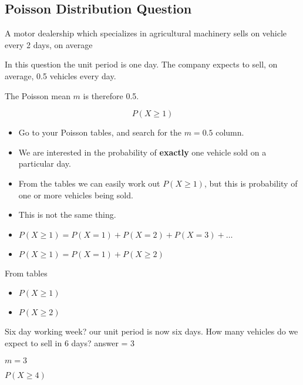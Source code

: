 \documentclass[]{report}
\begin{document}
\subsection{Poisson Distribution Question}

A motor dealership which specializes in agricultural machinery sells on vehicle every 2 days, on average


In this question the unit period is one day. The company expects to sell, on average, 0.5 vehicles every day.

The Poisson mean $m$ is therefore 0.5.


\[P(X \geq 1)\]


\begin{itemize}
\item Go to your Poisson tables, and search for the $m=0.5$ column.

\item We are interested in the probability of \textbf{exactly} one vehicle sold on a particular day.

\item From the tables we can easily work out $P(X \geq 1)$, but this is probability of one or more vehicles being sold.

\item This is not the same thing.
\end{itemize}


\begin{itemize}
\item
$P(X \geq 1) = P(X =1) + P( X=2) + P(X=3) + \ldots$
\item 
$P(X \geq 1) = P(X=1) + P(X \geq 2)$
\end{itemize}
From tables
\begin{itemize}
\item$P(X \geq 1)$
\item$P(X \geq 2)$
\end{itemize}

Six day working week?
our unit period is now six days.
How many vehicles do we expect to sell in 6 days?
answer = 3

$m=3$


$P(X\geq 4)$
\end{document}
